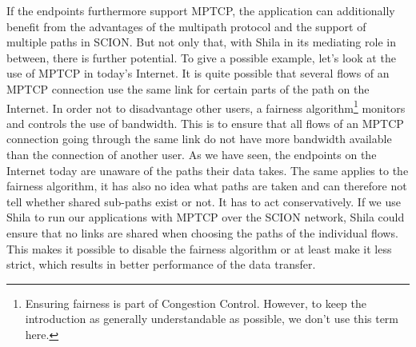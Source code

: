 If the endpoints furthermore support MPTCP, the application can additionally benefit from the advantages of the multipath protocol and the support of multiple paths in SCION. But not only that, with Shila in its mediating role in between, there is further potential. To give a possible example, let's look at the use of MPTCP in today's Internet. It is quite possible that several flows of an MPTCP connection use the same link for certain parts of the path on the Internet. In order not to disadvantage other users, a fairness algorithm\footnote{Ensuring fairness is part of Congestion Control. However, to keep the introduction as generally understandable as possible, we don't use this term here.} monitors and controls the use of bandwidth. This is to ensure that all flows of an MPTCP connection going through the same link do not have more bandwidth available than the connection of another user. As we have seen, the endpoints on the Internet today are unaware of the paths their data takes. The same applies to the fairness algorithm, it has also no idea what paths are taken and can therefore not tell whether shared sub-paths exist or not. It has to act conservatively. If we use Shila to run our applications with MPTCP over the SCION network, Shila could ensure that no links are shared when choosing the paths of the individual flows. This makes it possible to disable the fairness algorithm or at least make it less strict, which results in better performance of the data transfer.